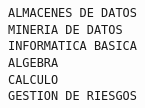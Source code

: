 \documentclass[11pt]{report}
\begin{document}
\begin{itemize}
\begin{verbatim}
ALMACENES DE DATOS                                                                                                                                                                                                                                                                                                                                                                                                                                                                                                  
MINERIA DE DATOS                                                                                                                                                                                                                                                                                                                                                                                                                                                                                                    
INFORMATICA BASICA                                                                                                                                                                                                                                                                                                                                                                                                                                                                                                  
ALGEBRA                                                                                                                                                                                                                                                                                                                                                                                                                                                                                                             
CALCULO                                                                                                                                                                                                                                                                                                                                                                                                                                                                                                             
GESTION DE RIESGOS                                                                                                                                                                                                                                                                                                                                                                                                                                                                                                  

\end{verbatim}
\end{itemize}
\end{document}
